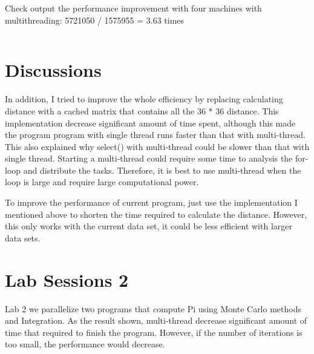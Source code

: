 \documentclass[11pt, letterpaper]{article}
\begin{document}
	\noindent \large Check output the performance improvement with four machines with multithreading: 5721050 / 1575955 = 3.63 times
	\vspace{-0.2in}
	\begin{lstlisting}

	\end{lstlisting}
	
	\section {Discussions}
	In addition, I tried to improve the whole efficiency by replacing calculating distance with a cached matrix that contains all the 36 * 36 distance. This implementation decrease significant amount of time spent, although this made the program program with single thread runs faster than that with multi-thread. This also explained why select() with multi-thread could be slower than that with single thread. Starting a multi-thread could require some time to analysis the for-loop and distribute the tasks. Therefore, it is best to use multi-thread when the loop is large and require large computational power. \par To improve the performance of current program, just use the implementation I mentioned above to shorten the time required to calculate the distance. However, this only works with the current data set, it could be less efficient with larger data sets.
	
	\section {Lab Sessions 2}
	Lab 2 we parallelize two programs that compute Pi using Monte Carlo methods and Integration. As the result shown, multi-thread decrease significant amount of time that required to finish the program. However, if the number of iterations is too small, the performance would decrease.
	
\end{document}
